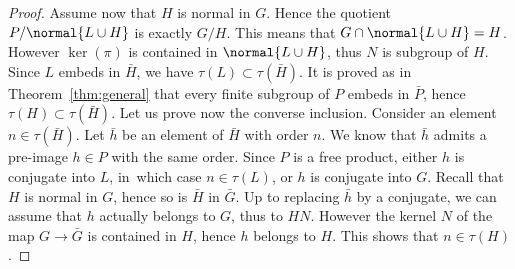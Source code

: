 \begin{proof}
Assume now that $H$ is normal in $G$.
Hence the quotient $P / \normal{ L \cup H}$ is exactly $G/H$.
This means that $G \cap \normal{L \cup H} = H$.
However $\ker(\pi)$ is contained in $\normal{L \cup H}$, thus $N$ is subgroup of $H$.
Since $L$ embeds in $\bar H$, we have $\tau(L) \subset \tau(\bar H)$.
It is proved as in Theorem~\ref{thm:general} that every finite subgroup of $P$ embeds in $\bar{P}$, hence $\tau(H) \subset \tau(\bar H)$.
Let us prove now the converse inclusion.
Consider an element $n \in \tau(\bar H)$.
Let $\bar h$ be an element of $\bar H$ with order $n$.
We know that $\bar h$ admits a pre-image $h \in P$ with the same order.
Since $P$ is a free product, either $h$ is conjugate into $L$, in~which case $n \in \tau(L)$, or $h$ is conjugate into $G$.
Recall that $H$ is normal in $G$, hence so is $\bar H$ in $\bar G$.
Up to replacing $\bar h$ by a conjugate, we can assume that $h$ actually belongs to $G$, thus to $HN$.
However the kernel $N$ of the map $G\to \bar G$ is contained in $H$, hence $h$ belongs to $H$.
This shows that $n \in \tau(H)$.
\end{proof}

